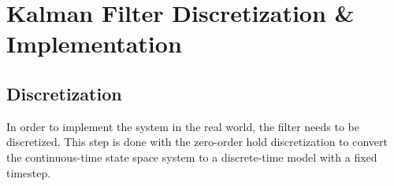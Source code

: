 \begin{adjustwidth}{-0.23cm}{0cm} \hfuzz=7.0pt \vfuzz=20.0pt
\end{adjustwidth}
\newpage


\section{Kalman Filter Discretization \& Implementation}\label{apx:kalman}
\subsection{Discretization}
In order to implement the system in the real world, the filter needs to be discretized. This step is done with the zero-order hold discretization to convert the continuous-time state space system to a discrete-time model with a fixed timestep.\cite{kalman-discretization}

